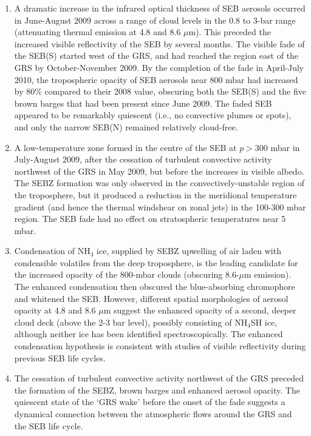 \documentclass[final,5p,times,twocolumn,authoryear]{elsarticle}
\begin{document}
\begin{enumerate}

\item A dramatic increase in the infrared optical thickness of SEB aerosols occurred in June-August 2009 across a range of cloud levels in the 0.8 to 3-bar range (attenuating thermal emission at 4.8 and 8.6 $\mu$m).  This preceded the increased visible reflectivity of the SEB by several months.  The visible fade of the SEB(S) started west of the GRS, and had reached the region east of the GRS by October-November 2009.  By the completion of the fade in April-July 2010, the tropospheric opacity of SEB aerosols near 800 mbar had increased by 80\% compared to their 2008 value, obscuring both the SEB(S) and the five brown barges that had been present since June 2009.  The faded SEB appeared to be remarkably quiescent (i.e., no convective plumes or spots), and only the narrow SEB(N) remained relatively cloud-free.

\item A low-temperature zone formed in the centre of the SEB at $p>300$ mbar in July-August 2009, after the cessation of turbulent convective activity northwest of the GRS in May 2009, but before the increases in visible albedo.   The SEBZ formation was only observed in the convectively-unstable region of the troposphere, but it produced a reduction in the meridional temperature gradient (and hence the thermal windshear on zonal jets) in the 100-300 mbar region.  The SEB fade had no effect on stratospheric temperatures near 5 mbar.
 
\item Condensation of NH$_3$ ice, supplied by SEBZ upwelling of air laden with condensible volatiles from the deep troposphere, is the leading candidate for the increased opacity of the 800-mbar clouds (obscuring 8.6-$\mu$m emission).  The enhanced condensation then obscured the blue-absorbing chromophore and whitened the SEB.  However, different spatial morphologies of aerosol opacity at 4.8 and 8.6 $\mu$m suggest the enhanced opacity of a second, deeper cloud deck (above the 2-3 bar level), possibly consisting of NH$_4$SH ice, although neither ice has been identified spectroscopically.  The enhanced condensation hypothesis is consistent with studies of visible reflectivity during previous SEB life cycles.

\item The cessation of turbulent convective activity northwest of the GRS preceded the formation of the SEBZ, brown barges and enhanced aerosol opacity.  The quiescent state of the `GRS wake' before the onset of the fade suggests a dynamical connection between the atmospheric flows around the GRS and the SEB life cycle.


\end{enumerate}
\end{document}
